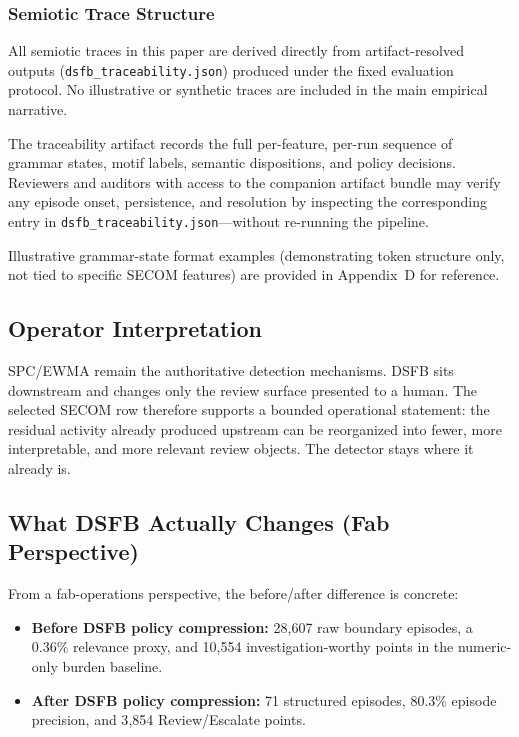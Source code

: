 \documentclass[11pt,letterpaper]{article}
\theoremstyle{scresult}
\begin{document}
\subsubsection{Semiotic Trace Structure}

All semiotic traces in this paper are derived directly from artifact-resolved
outputs (\texttt{dsfb\_traceability.json}) produced under the fixed evaluation
protocol. No illustrative or synthetic traces are included in the main empirical
narrative.

The traceability artifact records the full per-feature, per-run sequence of
grammar states, motif labels, semantic dispositions, and policy decisions.
Reviewers and auditors with access to the companion artifact bundle may verify
any episode onset, persistence, and resolution by inspecting the corresponding
entry in \texttt{dsfb\_traceability.json}---without re-running the pipeline.

Illustrative grammar-state format examples (demonstrating token structure only,
not tied to specific SECOM features) are provided in Appendix~D for reference.

\subsection{Operator Interpretation}

SPC/EWMA remain the authoritative detection mechanisms. DSFB sits downstream
and changes only the review surface presented to a human. The selected SECOM
row therefore supports a bounded operational statement: the residual activity
already produced upstream can be reorganized into fewer, more interpretable,
and more relevant review objects. The detector stays where it already is.

\subsection{What DSFB Actually Changes (Fab Perspective)}

From a fab-operations perspective, the before/after difference is concrete:
\begin{itemize}
  \item \textbf{Before DSFB policy compression:} 28{,}607 raw boundary
        episodes, a 0.36\% relevance proxy, and 10{,}554 investigation-worthy
        points in the numeric-only burden baseline.
  \item \textbf{After DSFB policy compression:} 71 structured episodes, 80.3\%
        episode precision, and 3{,}854 Review/Escalate points.
\end{itemize}
\end{document}
